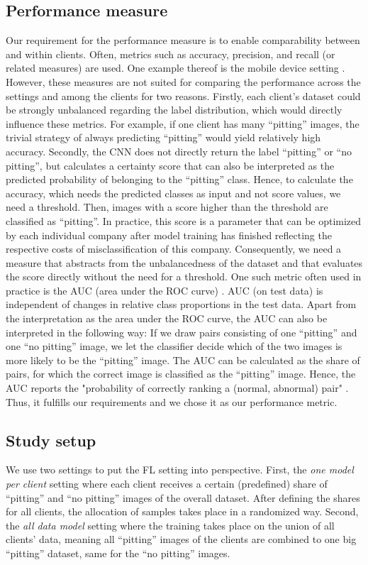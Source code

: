 \subsection{Performance measure\label{sec:methodology_performance_measure}}
Our requirement for the performance measure is to enable comparability between and within clients. Often, metrics such as accuracy, precision, and recall (or related measures) are used. One example thereof is the mobile device setting \citep{mcmahan2017communication, yang2019federated}. However, these measures are not suited for comparing the performance across the settings and among the clients for two reasons. Firstly, each client's dataset could be strongly unbalanced regarding the label distribution, which would directly influence these metrics. For example, if one client has many ``pitting'' images, the trivial strategy of always predicting ``pitting'' would yield relatively high accuracy. Secondly, the CNN does not directly return the label ``pitting'' or ``no pitting'', but calculates a certainty score that can also be interpreted as the predicted probability of belonging to the ``pitting'' class. Hence, to calculate the accuracy, which needs the predicted classes as input and not score values, we need a threshold. Then, images with a score higher than the threshold are classified as ``pitting''. In practice, this score is a parameter that can be optimized by each individual company after model training has finished reflecting the respective costs of misclassification of this company. Consequently, we need a measure that abstracts from the unbalancedness of the dataset and that evaluates the score directly without the need for a threshold. One such metric often used in practice is the AUC (area under the ROC curve) \citep{hanley1982meaning}. AUC (on test data) is independent of changes in relative class proportions in the test data. Apart from the interpretation as the area under the ROC curve, the AUC can also be interpreted in the following way: If we draw pairs consisting of one ``pitting'' and one ``no pitting'' image, we let the classifier decide which of the two images is more likely to be the ``pitting'' image. The AUC can be calculated as the share of pairs, for which the correct image is classified as the ``pitting'' image. Hence, the AUC reports the "probability of correctly ranking a (normal, abnormal) pair" \citep{hanley1982meaning}. Thus, it fulfills our requirements and we chose it as our performance metric.

\subsection{Study setup\label{sec:methodology_study_setup}}
We use two settings to put the FL setting into perspective. First, the \emph{one model per client} setting where each client receives a certain (predefined) share of ``pitting'' and ``no pitting'' images of the overall dataset. After defining the shares for all clients, the allocation of samples takes place in a randomized way.
Second, the \emph{all data model} setting where the training takes place on the union of all clients' data, meaning all ``pitting'' images of the clients are combined to one big ``pitting'' dataset, same for the ``no pitting'' images.


